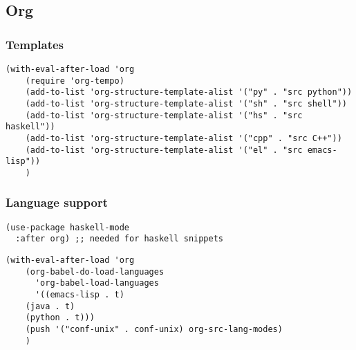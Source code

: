 \documentclass[11pt]{article}
\begin{document}
\subsection{Org}
\label{sec:org07bb6b2}
\subsubsection{Templates}
\label{sec:orgd5656c2}
\begin{verbatim}
(with-eval-after-load 'org
    (require 'org-tempo)
    (add-to-list 'org-structure-template-alist '("py" . "src python"))
    (add-to-list 'org-structure-template-alist '("sh" . "src shell"))
    (add-to-list 'org-structure-template-alist '("hs" . "src haskell"))
    (add-to-list 'org-structure-template-alist '("cpp" . "src C++"))
    (add-to-list 'org-structure-template-alist '("el" . "src emacs-lisp"))
    )
\end{verbatim}

\subsubsection{Language support}
\label{sec:org5edf529}

\begin{verbatim}
(use-package haskell-mode
  :after org) ;; needed for haskell snippets

\end{verbatim}

\begin{verbatim}
(with-eval-after-load 'org
    (org-babel-do-load-languages
      'org-babel-load-languages
      '((emacs-lisp . t)
	(java . t)
	(python . t)))
    (push '("conf-unix" . conf-unix) org-src-lang-modes)
    )
\end{verbatim}
\end{document}
